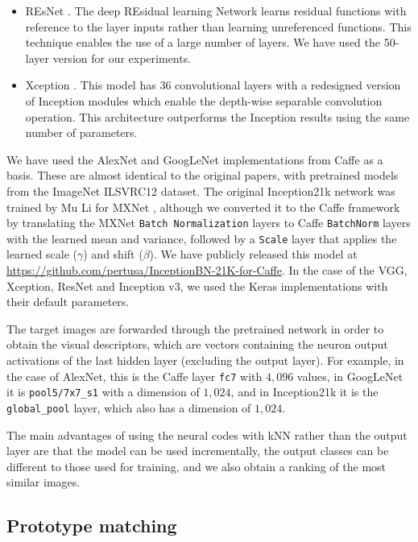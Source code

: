 \documentclass[final, twocolumn]{elsarticle}
\begin{document}
\begin{itemize}
\item REsNet \cite{resnet}. The deep REsidual learning Network learns residual functions with reference to the layer inputs rather than learning unreferenced functions. This technique enables the use of a large number of layers. We have used the 50-layer version for our experiments.

\item Xception \cite{xception}. This model has 36 convolutional layers with a redesigned version of Inception modules which enable the depth-wise separable convolution operation. This architecture outperforms the Inception results using the same number of parameters.
\end{itemize}

We have used the AlexNet and GoogLeNet implementations from Caffe \citep{Jia2014CaffeEmbedding} as a basis. These are almost identical to the original papers, with pretrained models from the ImageNet ILSVRC12 dataset. The original Inception21k network was trained by Mu Li for MXNet \citep{MXNet}, although we converted it to the Caffe framework by translating the MXNet \texttt{Batch Normalization} layers to Caffe \texttt{BatchNorm} layers with the learned mean and variance, followed by a \texttt{Scale} layer that applies the learned scale ($\gamma$) and shift ($\beta$). We have publicly released this model at \url{https://github.com/pertusa/InceptionBN-21K-for-Caffe}. In the case of the VGG, Xception, ResNet and Inception v3, we used the Keras \cite{keras} implementations with their default parameters.

The target images are forwarded through the pretrained network in order to obtain the visual descriptors, which are vectors containing the neuron output activations of the last hidden layer (excluding the output layer). For example, in the case of AlexNet, this is the Caffe layer \texttt{fc7} with $4,096$ values, in GoogLeNet it is \texttt{pool5/7x7\_s1} with a dimension of $1,024$, and in Inception21k it is the \texttt{global\_pool} layer, which also has a dimension of $1,024$.

The main advantages of using the neural codes with kNN rather than the output layer are that the model can be used incrementally, the output classes can be different to those used for training, and we also obtain a ranking of the most similar images.


\subsection{Prototype matching}
\label{classification}
\end{document}
